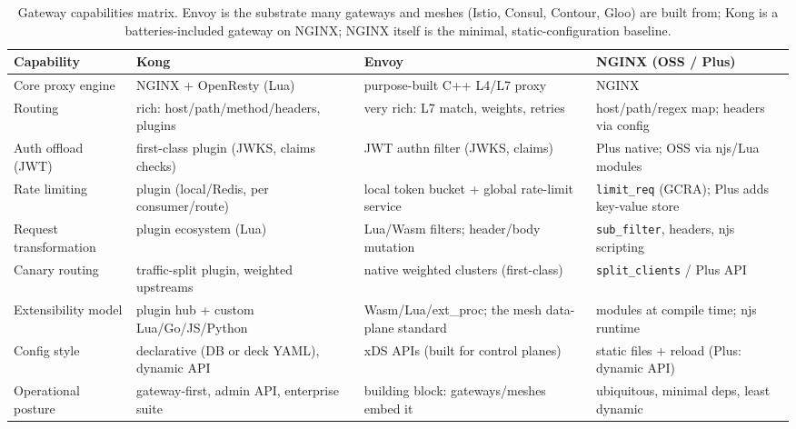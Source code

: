 \begin{table}[h]
  \centering
  \small
  \begin{tabularx}{\textwidth}{l X X X}
    \toprule
    \textbf{Capability} & \textbf{Kong} & \textbf{Envoy} & \textbf{NGINX (OSS / Plus)} \\
    \midrule
    Core proxy engine & NGINX + OpenResty (Lua) & purpose-built C++ L4/L7 proxy & NGINX \\
    Routing & rich: host/path/method/headers, plugins & very rich: L7 match, weights, retries & host/path/regex map; headers via config \\
    Auth offload (JWT) & first-class plugin (JWKS, claims checks) & JWT authn filter (JWKS, claims) & Plus native; OSS via njs/Lua modules \\
    Rate limiting & plugin (local/Redis, per consumer/route) & local token bucket + global rate-limit service & \texttt{limit\_req} (GCRA); Plus adds key-value store \\
    Request transformation & plugin ecosystem (Lua) & Lua/Wasm filters; header/body mutation & \texttt{sub\_filter}, headers, njs scripting \\
    Canary routing & traffic-split plugin, weighted upstreams & native weighted clusters (first-class) & \texttt{split\_clients} / Plus API \\
    Extensibility model & plugin hub + custom Lua/Go/JS/Python & Wasm/Lua/ext\_proc; the mesh data-plane standard & modules at compile time; njs runtime \\
    Config style & declarative (DB or deck YAML), dynamic API & xDS APIs (built for control planes) & static files + reload (Plus: dynamic API) \\
    Operational posture & gateway-first, admin API, enterprise suite & building block: gateways/meshes embed it & ubiquitous, minimal deps, least dynamic \\
    \bottomrule
  \end{tabularx}
  \caption{Gateway capabilities matrix. Envoy is the substrate many
  gateways and meshes (Istio, Consul, Contour, Gloo) are built from; Kong
  is a batteries-included gateway on NGINX; NGINX itself is the minimal,
  static-configuration baseline.}
  \label{tab:ch17-gateway-matrix}
\end{table}

